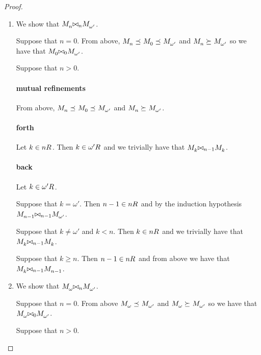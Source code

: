 \begin{proof}
\begin{enumerate}
    \item We show that $\kPModel{n} \bisimref[n] \kPModel{\omega'}$.

    Suppose that $n = 0$. 
    From above, $\kPModel{n} \refines \kPModel{0} \refines \kPModel{\omega'}$ and $\kPModel{n} \simulates \kPModel{\omega'}$ so we have that $\kPModel{0} \bisimref[0] \kPModel{\omega'}$.

    Suppose that $n > 0$.

    \paragraph{mutual refinements}

    From above, $\kPModel{n} \refines \kPModel{0} \refines \kPModel{\omega'}$ and $\kPModel{n} \simulates \kPModel{\omega'}$.

    \paragraph{forth}

    Let $k \in \kSuccessors{}{n}$. 
    Then $k \in \kSuccessors{}{\omega'}$ and we trivially have that $\kPModel{k} \bisimref[n - 1] \kPModel{k}$.

    \paragraph{back}

    Let $k \in \kSuccessors{}{\omega'}$. 

    Suppose that $k = \omega'$. 
    Then $n - 1 \in \kSuccessors{}{n}$ and by the induction hypothesis $\kPModel{n - 1} \bisimref[n - 1] \kPModel{\omega'}$.

    Suppose that $k \neq \omega'$ and $k < n$. Then $k \in \kSuccessors{}{n}$ and we trivially have that $\kPModel{k} \bisimref[n - 1] \kPModel{k}$.

    Suppose that $k \geq n$. Then $n - 1 \in \kSuccessors{}{n}$ and from above we have that $\kPModel{k} \bisimref[n - 1] \kPModel{n - 1}$.
    
    \item We show that $\kPModel{\omega} \bisimref[n] \kPModel{\omega'}$.

    Suppose that $n = 0$. 
    From above $\kPModel{\omega} \refines \kPModel{\omega'}$ and  $\kPModel{\omega} \simulates \kPModel{\omega'}$ so we have that $\kPModel{\omega} \bisimref[0] \kPModel{\omega'}$.

    Suppose that $n > 0$.


\end{enumerate}
\end{proof}

